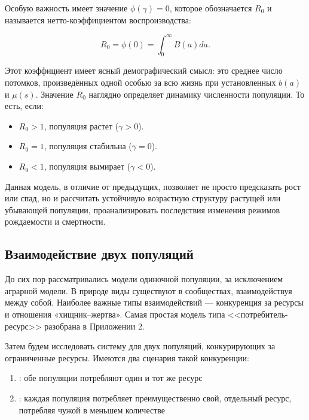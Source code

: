 \documentclass[a4paper, 14pt]{extarticle}
\begin{document}
Особую важность имеет значение $\phi(\gamma) = 0$, которое обозначается \( R_0 \) и называется нетто-коэффициентом воспроизводства:

\begin{equation}
R_0 = \phi(0) = \int_{0}^{\infty} B(a) da.
\end{equation}

Этот коэффициент имеет ясный демографический смысл: это среднее число потомков, произведённых одной особью за всю жизнь при установленных $b(a)$ и $\mu(s)$. Значение $R_0$ наглядно определяет динамику численности популяции. То есть, если:

\begin{itemize}
\item \( R_0 > 1 \), популяция растет (\( \gamma > 0 \)).
\item \( R_0 = 1 \), популяция стабильна (\( \gamma = 0 \)).
\item \( R_0 < 1 \), популяция вымирает (\( \gamma < 0 \)).
\end{itemize}

Данная модель, в отличие от предыдущих, позволяет не просто предсказать рост или спад, но и рассчитать устойчивую возрастную структуру растущей или убывающей популяции, проанализировать последствия изменения режимов рождаемости и смертности.

\subsection{Взаимодействие двух популяций}

До сих пор рассматривались модели одиночной популяции, за исключением аграрной модели. В природе виды существуют в сообществах, взаимодействуя между собой. Наиболее важные типы взаимодействий — конкуренция за ресурсы и отношения «хищник–жертва». Самая простая модель типа <<потребитель-ресурс>> разобрана в Приложении 2.

Затем будем исследовать систему для двух популяций, конкурирующих за ограниченные ресурсы. Имеются два сценария такой конкуренции:

\begin{enumerate}
    \item {}: обе популяции потребляют один и тот же ресурс
    \item {}: каждая популяция потребляет преимущественно свой, отдельный ресурс, потребляя чужой в меньшем количестве
\end{enumerate}
\end{document}
